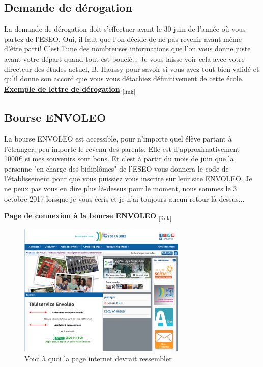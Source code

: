 \subsection{Demande de dérogation}\label{sec:sec3.2.4}
La demande de dérogation doit s'effectuer avant le 30 juin de l'année où vous partez de l'ESEO. Oui, il faut que l'on décide de ne pas revenir avant même d'être parti! C'est l'une des nombreuses informations que l'on vous donne juste avant votre départ quand tout est bouclé... Je vous laisse voir cela avec votre directeur des études actuel, B. Haussy pour savoir si vous avez tout bien validé et qu'il donne son accord que vous vous détachiez définitivement de cette école.
\bigbreak
\href{Annexes/Sherbrooke/Demande_Derogation_COSNEAU_Alexandre.pdf}{\textbf{Exemple de lettre de dérogation}}\textsubscript{  [link]}

\subsection{Bourse ENVOLEO}\label{sec:sec3.2.5}
La bourse ENVOLEO est accessible, pour n'importe quel élève partant à l'étranger, peu importe le revenu des parents. Elle est d'approximativement 1000\euro{} si mes souvenirs sont bons. Et c'est à partir du mois de juin que la personne "en charge des bidiplômes" de l'ESEO vous donnera le code de l'établissement pour que vous puissiez vous inscrire sur leur site ENVOLEO. Je ne peux pas vous en dire plus là-dessus pour le moment, nous sommes le 3 octobre 2017 lorsque je vous écris et je n'ai toujours aucun retour là-dessus...

\bigbreak
\href{http://www.envoleo.paysdelaloire.fr}{\textbf{Page de connexion à la bourse ENVOLEO}}\textsubscript{  [link]}
\bigbreak

\begin{figure}[h!]
\centering
\includegraphics[width = 80mm]{figures/Site_Envoleo}
\caption{Voici à quoi la page internet devrait ressembler}
\end{figure}


